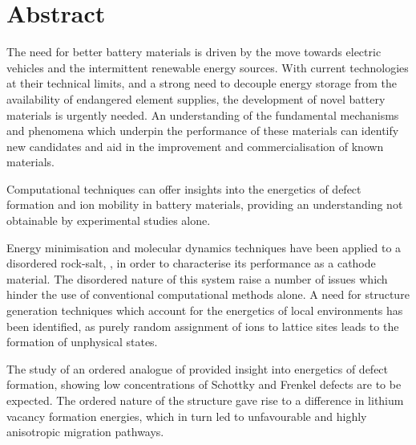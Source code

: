 \chapter*{Abstract}
The need for better battery materials is driven by the move towards electric vehicles and the intermittent renewable energy sources.
With current technologies at their technical limits, and a strong need to decouple energy storage from the availability of endangered element supplies, the development of novel battery materials is urgently needed.
An understanding of the fundamental mechanisms and phenomena which underpin the performance of these materials can identify new candidates and aid in the improvement and commercialisation of known materials.

Computational techniques can offer insights into the energetics of defect formation and ion mobility in battery materials, providing an understanding not obtainable by experimental studies alone.

Energy minimisation and molecular dynamics techniques have been applied to a disordered rock-salt, , in order to characterise its performance as a cathode material.
The disordered nature of this system raise a number of issues which hinder the use of conventional computational methods alone.
A need for structure generation techniques which account for the energetics of local environments has been identified, as purely random assignment of ions to lattice sites leads to the formation of unphysical states.

The study of an ordered analogue of  provided insight into energetics of defect formation, showing low concentrations of Schottky and Frenkel defects are to be expected.
The ordered nature of the structure gave rise to a difference in lithium vacancy formation energies, which in turn led to unfavourable and highly anisotropic migration pathways.

